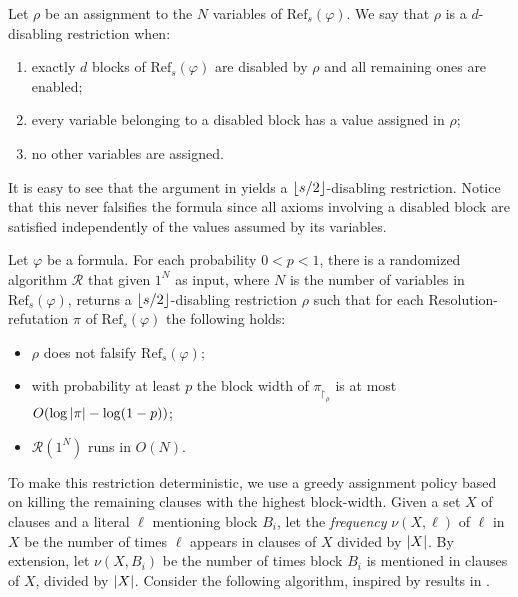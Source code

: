 \begin{definition}
    Let $\rho$ be an assignment to the $N$ variables of $\mathrm{Ref}_s(\varphi)$. We say that $\rho$ is a $d$-disabling restriction when:
    \begin{enumerate}[label={(\roman*)}, nosep]
        \item exactly $d$ blocks of $\mathrm{Ref}_s(\varphi)$ are disabled by $\rho$ and all remaining ones are enabled;
        \item every variable belonging to a disabled block has a value assigned in $\rho$;
        \item no other variables are assigned.
    \end{enumerate}
\end{definition}

It is easy to see that the argument in  yields a $\left \lfloor s/2 \right \rfloor$-disabling restriction. Notice that this never falsifies the formula since all axioms involving a disabled block are satisfied independently of the values assumed by its variables. 

\begin{corollary}
    Let $\varphi$ be a formula. For each probability $0 < p < 1$, there is a randomized algorithm $\mathcal{R}$ that given $1^N$ as input, where $N$ is the number of variables in $\mathrm{Ref}_s(\varphi)$, returns a $\left \lfloor s/2 \right \rfloor$-disabling restriction $\rho$ such that for each Resolution-refutation $\pi$ of $\mathrm{Ref}_s(\varphi)$ the following holds:
    \begin{itemize}[nosep]
        \item $\rho$ does not falsify $\mathrm{Ref}_s(\varphi)$;
        \item with probability at least $p$ the block width of $\pi_{\upharpoonright_\rho}$ is at most $O(\log \left|\pi\right| - \log(1-p))$;
        \item $\mathcal{R}(1^N)$ runs in $O(N)$.
    \end{itemize}
\end{corollary}

To make this restriction deterministic, we use a greedy assignment policy based on killing the remaining clauses with the highest block-width. Given a set $X$ of clauses and a literal $\ell$ mentioning block $B_i$, let the \textit{frequency} $\nu(X, \ell)$ of $\ell$ in $X$ be the number of times $\ell$ appears in clauses of $X$ divided by $\left|X\right|$. By extension, let $\nu(X, B_i)$ be the number of times block $B_i$ is mentioned in clauses of $X$, divided by $\left|X\right|$. Consider the following algorithm, inspired by results in \cite{cook_pitassi,pitassi,bs_wigder}.

